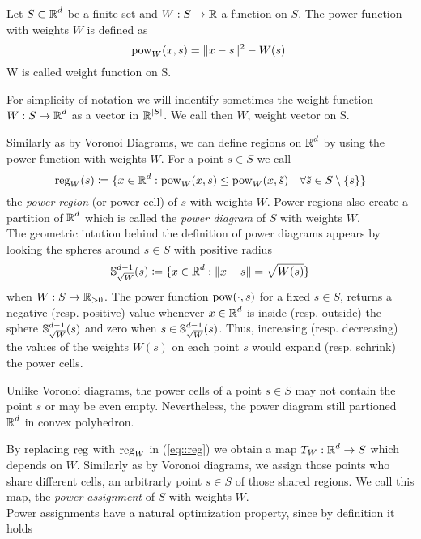 \documentclass[
     12pt,         %
     a4paper,      %
     BCOR=10mm,     %
     DIV=14,        %
     ]{scrreprt}
\begin{document}
    \begin{defi}      
        Let $S\subset \operatorname{\mathbb{R}}^d$ be a finite set and $W: S \to \operatorname{\mathbb{R}} $ a function on $S$. The power function with weights $W$ is defined as
        \[ \operatorname{pow}_W(x,s) = \|x-s\|^2 - W(s). \]
        W is called weight function on S.
    \end{defi}
    \begin{rem}
        For simplicity of notation we will indentify sometimes the weight function $W:S\to\operatorname{\mathbb{R}}^d$  as a vector in $\operatorname{\mathbb{R}}^{|S|}$.  We call then
        $W$, weight vector on S.
    \end{rem}
    Similarly as by Voronoi Diagrams, we can define regions on $\operatorname{\mathbb{R}}^d$ by using the power function with weights $W$.
    For a point $s\in S$ we call 
    \[\operatorname{reg}_W(s) \coloneqq \{x \in \operatorname{\mathbb{R}}^d : \operatorname{pow}_W(x,s) \le \operatorname{pow}_W(x,\tilde s) \quad  \forall \tilde s \in S\setminus \{s\} \} \]
    the \textit{power region} (or power cell) of $s$ with weights $W$. Power regions also create a partition of $\operatorname{\mathbb{R}}^d$ which is called the \textit{power diagram} of $S$ with weights $W$. \\
    The geometric intution behind the definition of power diagrams appears by looking the spheres around $s\in S$ with positive radius %
    \[\operatorname{\mathbb{S}}_{\sqrt W}^{d-1}(s) \coloneqq \{x \in \operatorname{\mathbb{R}}^d : \| x-s \| = \sqrt{W(s)} \} \]
    when $W : S \to \operatorname{\mathbb{R}}_{>0} $. The power function $\operatorname{pow}(\cdot, s)$ for a fixed $s\in S$, returns a negative (resp. positive) value whenever $x\in \operatorname{\mathbb{R}}^d$ is inside 
    (resp. outside) the sphere $\operatorname{\mathbb{S}}_{\sqrt W}^{d-1}(s)$ and zero when $s\in \operatorname{\mathbb{S}}_{\sqrt W}^{d-1}(s)$. Thus, increasing (resp. decreasing) the values of the weights $W(s)$ on each point $s$ would expand (resp. schrink)
    the power cells. 
    \begin{rem}
        Unlike Voronoi diagrams, the power cells of a point $s\in S$ may not contain the point $s$ or may be even empty. Nevertheless, the power diagram still partioned $\operatorname{\mathbb{R}}^d$ in 
        convex polyhedron.
    \end{rem}
    By replacing $\operatorname{reg}$ with $\operatorname{reg}_W$ in (\ref{eq::reg}) we obtain a map $T_W: \operatorname{\mathbb{R}}^d \to S$ which depends on $W$.  Similarly as by Voronoi diagrams, we assign those points who share
    different cells, an arbitrarly point $s\in S$ of those shared regions. We call this map, the \textit{power assignment} of $S$ with weights $W$. \\
    Power assignments have a natural optimization property, since by definition it holds 
\end{document}
